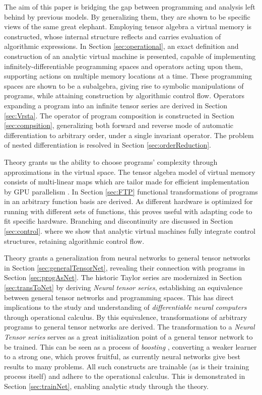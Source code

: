 \documentclass[smallcondensed]{svjour3}
\begin{document}
The aim of this paper is bridging the gap between programming and analysis left
behind by previous models. By generalizing them, they are shown to be specific
views of the same great elephant. Employing tensor algebra a virtual memory is
constructed, whose internal structure reflects and carries evaluation of
algorithmic expressions. In Section \ref{sec:operational}, an exact definition
and construction of an analytic virtual machine is presented, capable of
implementing infinitely-differentiable programming spaces and operators acting
upon them, supporting actions on multiple memory locations at a time. These
programming spaces are shown to be a subalgebra, giving rise to symbolic
manipulations of programs, while attaining construction by algorithmic control
flow. Operators expanding a program into an infinite tensor series are derived
in Section \ref{sec:Vrsta}. The operator of program composition is constructed
in Section \ref{sec:compsition}, generalizing both forward \cite{PcAD} and
reverse \cite{ReverseAD} mode of automatic differentiation to arbitrary order,
under a single invariant operator. The problem of nested differentiation is
resolved in Section \ref{sec:orderReduction}.

Theory grants us the ability to choose programs' complexity through
approximations in the virtual space. The tensor algebra model of virtual memory
consists of multi-linear maps which are tailor made for efficient implementation
by GPU parallelism \cite{TensorGPU}. In Section \ref{sec:FTP} functional
transformations of programs in an arbitrary function basis are derived. As
different hardware is optimized for running with different sets of functions, this
proves useful with adapting code to fit specific hardware. 
Branching and discontinuity are discussed in Section \ref{sec:control}. 
where we show that analytic virtual machines fully integrate control structures,
retaining algorithmic control flow. 
 
Theory grants a generalization from neural networks to general tensor networks in Section \ref{sec:generalTensorNet}, revealing their connection with programs in Section \ref{sec:progAsNet}.
The historic Taylor series are modernized in Section \ref{sec:transToNet} by deriving \emph{Neural tensor series}, establishing an equivalence between general tensor networks and programming spaces. This has direct implications to the study and understanding of \emph{differentiable neural computers} \cite{netRam} through operational calculus. By this equivalence, transformations of arbitrary programs to general tensor networks are derived. The transformation to a \emph{Neural Tensor series} serves as a great initialization point of a general tensor network to be trained. This can be seen as a process of \emph{boosting} \cite{boosting}, converting a weaker learner to a strong one, which proves fruitful, as currently neural networks give best results to many problems.
 All such constructs are trainable (as is their training process itself) and adhere to the operational calculus. This is demonstrated in Section \ref{sec:trainNet}, enabling analytic study through the theory.
\end{document}
